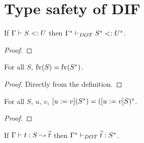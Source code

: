 \section{Type safety of DIF}

\begin{LEMMA}
    \label{pres_subtyping}
    If $\Gamma \vdash S <: U$ then $\Gamma^{*} \vdash_{DOT} S^{*} <: U^{*}$.
\end{LEMMA}

\begin{proof}
    \TODOTHIS
\end{proof}

\begin{LEMMA}
    \label{pres_fv}
    For all $S$, $\text{fv}(S) = \text{fv}(S^{*})$.
\end{LEMMA}

\begin{proof}
    Directly from the definition.
\end{proof}

\begin{LEMMA}
    \label{comm_trans_sub}
    For all $S$, $u$, $v$, $[u := v](S^{*}) = ([u := v]S)^{*}$.
\end{LEMMA}

\begin{proof}
    \TODOTHIS
\end{proof}

\begin{THEOREM}
    \label{tp_terms}
    If $\Gamma \vdash t: S \leadsto \widehat{t}$ then
    $\Gamma^{*} \vdash_{DOT} \widehat{t}: S^{*}$.
\end{THEOREM}

